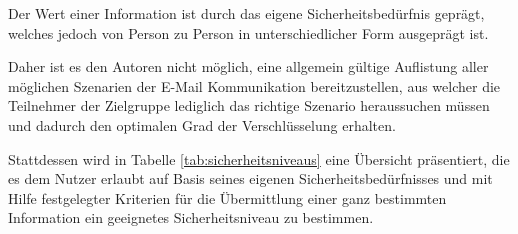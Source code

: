 \documentclass  [paper=a4,
				fontsize=12pt,
				listof=totoc,
				bibliography=totoc
				]{scrreprt}
\begin{document}
	
	
		Der Wert einer Information ist durch das eigene Sicherheitsbedürfnis geprägt, welches jedoch von Person zu Person in unterschiedlicher Form ausgeprägt ist.
		
		Daher ist es den Autoren nicht möglich, eine allgemein gültige Auflistung aller möglichen Szenarien der E-Mail Kommunikation bereitzustellen, aus welcher die Teilnehmer der Zielgruppe lediglich das richtige Szenario heraussuchen müssen und dadurch den optimalen Grad der Verschlüsselung erhalten. 
		
		Stattdessen wird in Tabelle \ref{tab:sicherheitsniveaus} eine Übersicht präsentiert, die es dem Nutzer erlaubt auf Basis seines eigenen Sicherheitsbedürfnisses und mit Hilfe festgelegter Kriterien für die Übermittlung einer ganz bestimmten Information ein geeignetes Sicherheitsniveau zu bestimmen. 
		\medskip\\
		
		
	
		
\end{document}
